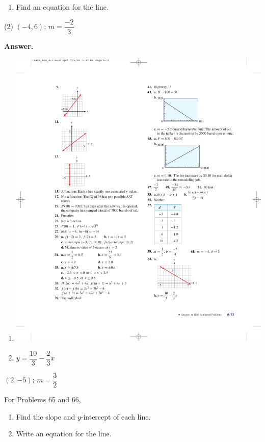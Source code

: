 \documentclass[10pt,]{book}
\theoremstyle{plain}
\theoremstyle{definition}
\theoremstyle{definition}
\theoremstyle{definition}
\theoremstyle{definition}
\numberwithin{equation}{part}
\begin{document}
\begin{exerciselist}
\begin{enumerate}[label=*\alph**]
\item\hypertarget{li-1632}{}Find an equation for the line.%
\end{enumerate}
%
\begin{exercisegroup}(2)
\exercise[63.]\hypertarget{exercise-459}{}\((-4, 6)\); \(m =\dfrac{-2}{3}\)%
\par\smallskip
\noindent\textbf{Answer.}\hypertarget{answer-254}{}\quad
\leavevmode%
\begin{multicols}{2}
\begin{enumerate}[label=*\alph**]
\item\hypertarget{li-1633}{}\includegraphics[width=0.8\linewidth]{images/fig-ans-chap1-rev-63}
%
\item\hypertarget{li-1634}{}\(y = \dfrac{10}{3}- \dfrac{2}{3}x\)%
\end{enumerate}
\end{multicols}
%
\exercise[64.]\hypertarget{exercise-460}{}\((2, -5)\); \(m =\dfrac{3}{2}\)%
\end{exercisegroup}
\par\smallskip\noindent
\hypertarget{exercisegroup-65}{}\par\noindent For Problems 65 and 66, \leavevmode%
\begin{enumerate}[label=*\alph**]
\item\hypertarget{li-1635}{}Find the slope and \(y\)-intercept of each line.%
\item\hypertarget{li-1636}{}Write an equation for the line.%

\end{enumerate}
\end{exerciselist}
\end{document}

